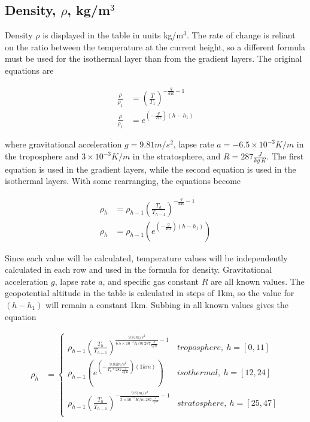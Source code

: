 \documentclass{article}
\begin{document}
\subsection{Density, \texorpdfstring{$\rho$}{}, kg/m\texorpdfstring{$^3$}{} }
Density $\rho$ is displayed in the table in units kg/m$^3$. The rate of change is reliant on the ratio between the temperature at the current height, so a different formula must be used for the isothermal layer than from the gradient layers. The original equations are 

\begin{align*}
    \frac{\rho}{\rho_1} &= {\left(\frac{T}{T_1}\right)}^{-\frac{g}{aR}-1} \\
    \frac{\rho}{\rho_1} &= e^{\left(- \frac{g}{RT}\right)\left(h-h_1\right)}
\end{align*}

where gravitational acceleration $g = 9.81m/s^2$, lapse rate $a= -6.5\times10^{-3} K/m$ in the troposphere and $3\times10^{-3}K/m$ in the stratosphere, and $R = 287 \frac{J}{kg\ K}$. The first equation is used in the gradient layers, while the second equation is used in the isothermal layers. With some rearranging, the equations become

\begin{align*}
    \rho_h &= \rho_{h-1}{\left(\frac{T_h}{T_{h-1}}\right)}^{-\frac{g}{aR}-1} \\
    \rho_h &= \rho_{h-1}\left(e^{\left(- \frac{g}{RT}\right)\left(h-h_1\right)}\right)
\end{align*}

Since each value will be calculated, temperature values will be independently calculated in each row and used in the formula for density. Gravitational acceleration $g$, lapse rate $a$, and specific gas constant $R$ are all known values. The geopotential altitude in the table is calculated in steps of 1km, so the value for $(h-h_1)$ will remain a constant 1km. Subbing in all known values gives the equation 

\begin{align}
    \rho_h &= \begin{cases}
    \rho_{h-1}{\left(\frac{T_h}{T_{h-1}}\right)}^{\frac{9.81 m/s^2}{6.5\times10^{-3}K/m\ 287 \frac{J}{kg\ K}}-1}    & troposphere,\ h = [0,11] \\
    \rho_{h-1}\left(e^{\left(- \frac{9.81 m/s^2}{T_h * 287 \frac{J}{kg\ K} }\right)\left(1 km\right)}\right)                                          & isothermal,\ h = [12,24] \\
    \rho_{h-1}{\left(\frac{T_h}{T_{h-1}}\right)}^{-\frac{9.81 m/s^2}{3\times10^{-3}K/m\ 287 \frac{J}{kg\ K}}-1}       & stratosphere,\ h = [25,47] \\
    \end{cases}
\end{align}
\end{document}
